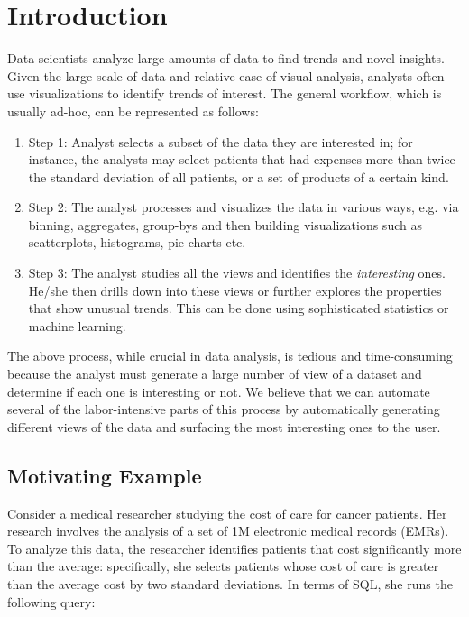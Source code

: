 \section{Introduction}
\label{sec:intro}
Data scientists analyze large amounts of data to find trends and novel insights.
Given the large scale of data and relative ease of visual analysis, analysts
often use visualizations to identify trends of interest. The general workflow,
which is usually ad-hoc, can be represented as follows:

\begin{enumerate}
  \item Step 1: Analyst selects a subset of the data they are interested in; for
  instance, the analysts may select patients that had expenses more than twice
  the standard deviation of all patients, or a set of products of a certain kind.
  \item Step 2: The analyst processes and visualizes the data in various ways,
  e.g. via binning, aggregates, group-bys and then building
  visualizations such as scatterplots, histograms, pie charts etc.
  \item Step 3: The analyst studies all the views and identifies the
  {\it interesting} ones. He/she then drills down into these views or further
  explores the properties that show unusual trends. This can be done using sophisticated
  statistics or machine learning.
\end{enumerate}

The above process, while crucial in data analysis, is tedious and time-consuming
because the analyst must generate a large number of view of a dataset and
determine if each one is interesting or not. We believe that we can automate
several of the labor-intensive parts of this process by automatically generating
different views of the data and surfacing the most interesting ones to the user.

\subsection{Motivating Example}
\label{motivation_example}

Consider a medical researcher studying the cost of care for cancer patients. Her
research involves the analysis of a set of 1M electronic medical records (EMRs).
To analyze this data, the researcher identifies patients that cost
significantly more than the average: specifically, she selects patients whose
cost of care is greater than the average cost by two standard deviations. In
terms of SQL, she runs the following query: \\

